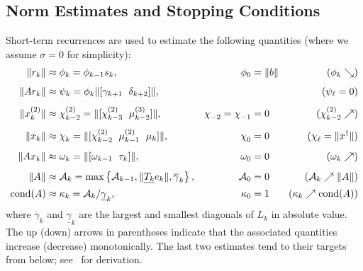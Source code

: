 \documentclass{doc_acmtrans2m}
\newcommand{\gamamin}{\underline{\gamma}}
\newcommand{\gamamax}{\overline{\gamma}}
\newcommand{\underTk}{\underline{T_k}}
\begin{document}
\subsection{Norm Estimates and Stopping Conditions}
\label{sect-norms-stopping-conds}

Short-term recurrences are used to estimate the following quantities
(where we assume $\sigma=0$ for simplicity):
\begin{align*}
  \norm{r_k} &\approx \phi_k = \phi_{k-1} s_k,
             &\phi_0 &= \norm{b} 
             &(\phi_k \searrow)
\\[1ex]
  \norm{Ar_k}&\approx \psi_k = \phi_k \norm{[\gamma_{k+1}\ \;\delta_{k+2}]},
  &  &
  & (\psi_\ell = 0)
\\[1ex]
   \norm{x_k^{(2)}} &\approx \chi_{k-2}^{(2)} =  \norm{[ \chi^{(2)}_{k-3}  \  \; \mu_{k-2}^{(3)}]},
    &  \chi_{-2}\drop  = \chi_{-1}\drop   &= 0 
    & (\chi_{k-2}^{(2)} \nearrow)
\\[1ex]
  \norm{x_k} &\approx \chi_k\drop = \norm{[\chi_{k-2}^{(2)}\ \;\mu_{k-1}^{(2)}\ \;\mu_k]},
             &\chi_0\drop &=  0
             &(\chi_{\ell}\drop = \norm{x^\dagger})
\\[1ex]
  \norm{A x_k} &\approx \omega_k = \norm{[\omega_{k-1} \ \; \tau_k]},
           &\omega_0 &= 0
           &(\omega_k \nearrow)
\\[1ex]
  \norm{A} &\approx \mathcal{A}_k =
            \max \left\{ \mathcal{A}_{k-1}, \norm{\underTk e_k}, \gamamax_k \right\},
           &\mathcal{A}_0 &= 0
           &(\mathcal{A}_k \nearrow  \norm{A})
\\[0.5ex]
  \cond(A) &\approx \kappa_k = \mathcal{A}_k / \gamamin_k,
           &\kappa_0 &= 1
           &(\kappa_k \nearrow \cond(A))
\end{align*}
where $\gamamax_k$ and $\gamamin_k$ are the largest and smallest
diagonals of $L_k$ in absolute value.  The up (down)
arrows in parentheses indicate that the associated quantities
increase (decrease) monotonically. The last two
estimates tend to their targets from below; see~\cite{C06,CPS11} for
derivation.
\end{document}
